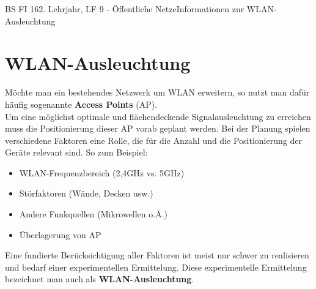 \documentclass[11pt,twocolumn,oneside,openany,headings=optiontotoc,11pt,numbers=noenddot]{article}
\begin{document}
	\begin{worksheet}{BS FI 16}{2. Lehrjahr, LF 9 - Öffentliche Netze}{Informationen zur WLAN-Ausleuchtung}
		\section{WLAN-Ausleuchtung}
		Möchte man ein bestehendes Netzwerk um WLAN erweitern, so nutzt man dafür häufig sogenannte \textbf{Access Points} (AP).\\
		Um eine möglichst optimale und flächendeckende Signalausleuchtung zu erreichen muss die Positionierung dieser AP vorab geplant werden. Bei der Planung spielen verschiedene Faktoren eine Rolle, die für die Anzahl und die Positionierung der Geräte relevant sind. So zum Beispiel:
		\begin{itemize}
			\item WLAN-Frequenzbereich (2,4GHz vs. 5GHz)
			\item Störfaktoren (Wände, Decken usw.)
			\item Andere Funkquellen (Mikrowellen o.Ä.)
			\item Überlagerung von AP
		\end{itemize}
		\par\noindent
		Eine fundierte Berücksichtigung aller Faktoren ist meist nur schwer zu realisieren und bedarf einer experimentellen Ermittelung. Diese experimentelle Ermittelung bezeichnet man auch als \textbf{WLAN-Ausleuchtung}.

\end{worksheet}
\end{document}
